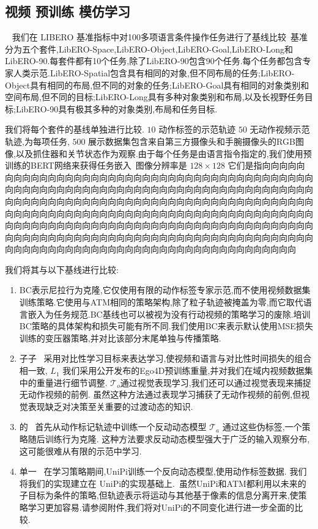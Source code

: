 \documentclass[conference]{IEEEtran}
\begin{document}
\subsection{视频 预训练 模仿学习}~\label{sec:video_bc}
我们在 LIBERO 基准指标中对100多项语言条件操作任务进行了基线比较~\cite{liu2023libero}基准分为五个套件,LibERO-Space,LibERO-Object,LibERO-Goal,LibERO-Long和LibERO-90.每套件都有10个任务,除了LibERO-90包含90个任务.每个任务都包含专家人类示范.LibERO-Spatial包含具有相同的对象,但不同布局的任务;LibERO-Object具有相同的布局,但不同的对象的任务;LibERO-Goal具有相同的对象类别和空间布局,但不同的目标;LibERO-Long具有多种对象类别和布局,以及长视野任务目标;LibERO-90具有极其多种的对象类别,布局和任务目标.

我们将每个套件的基线单独进行比较. $10$ 动作标签的示范轨迹 $50$ 无动作视频示范轨迹,为每项任务, $500$ 展示数据集包含来自第三方摄像头和手腕摄像头的RGB图像,以及抓住器和关节状态作为观察.由于每个任务是由语言指令指定的,我们使用预训练的BERT网络来获得任务嵌入~\cite{devlin2019-bert}图像分辨率是 $128\times128$ 它们是指向向向向向向向向向向向向向向向向向向向向向向向向向向向向向向向向向向向向向向向向向向向向向向向向向向向向向向向向向向向向向向向向向向向向向向向向向向向向向向向向向向向向向向向向向向向向向向向向向向向向向向向向向向向向向向向向向向向向向向向向向向向向向向向向向向向向向向向向向向向向向向向向向向向向向向向向向向向向向向向向向向向向向向向向向向向向向向向向向向向向向向向向向向向向向向向向向向向向向向向向向向向向向向向向向向向向向向向向向向向向向向向向向向向向向向向向向向向向向向向向向向向向向向向向向向向向向向向 

我们将其与以下基线进行比较:
\begin{enumerate}
    \item BC表示尼拉行为克隆,它仅使用有限的动作标签专家示范,而不使用视频数据集训练策略.它使用与ATM相同的策略架构,除了粒子轨迹被掩盖为零,而它取代语言嵌入为任务规范.BC基线也可以被视为没有行动视频的策略学习的废除.培训BC策略的具体架构和损失可能有所不同.我们使用BC来表示默认使用MSE损失训练的变压器策略,并对比该部分末尾单独与传播策略.
    \item  子子~\cite{nair2023r3m} 采用对比性学习目标来表达学习,使视频和语言与对比性时间损失的组合相一致, $L_{1}$ 我们采用公开发布的Ego4D预训练重量,并对我们在域内视频数据集中的重量进行细节调整. $\mathcal{T}_o$通过视觉表现学习,我们还可以通过视觉表现来捕捉无动作视频的前例. 虽然这种方法通过表现学习捕获了无动作视频的前例,但视觉表现缺乏对决策至关重要的过渡动态的知识.
    \item 的~\cite{baker2022vpt} 首先从动作标记轨迹中训练一个反动动态模型 $\mathcal{T}_a$ 通过这些伪标签,一个策略随后训练行为克隆. 这种方法要求反动动态模型强大于广泛的输入观察分布,这可能很难从有限的示范中学习. 
    \item 单一~\cite{du2023unipi, Ko2023Learning,black2023zero} 在学习策略期间,UniPi训练一个反向动态模型,使用动作标签数据. 我们将我们的实现建立在 UniPi的实现基础上.~\citet{Ko2023Learning}虽然UniPi和ATM都利用以未来的子目标为条件的策略,但轨迹表示将运动与其他基于像素的信息分离开来,使策略学习更加容易.请参阅附件,我们将对UniPi的不同变化进行进一步全面的比较. 
\end{enumerate}
\end{document}
